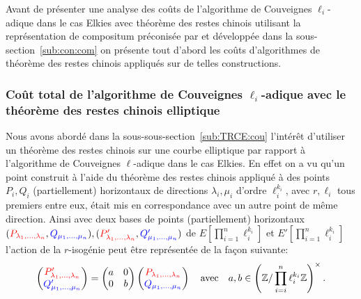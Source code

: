 \documentclass[10pt,a4paper]{book}
\theoremstyle{plain}
\theoremstyle{definition}
\theoremstyle{definition}
\theoremstyle{definition}
\theoremstyle{definition}
\theoremstyle{remark}
\theoremstyle{remark}
\theoremstyle{definition}
\begin{document}
Avant de présenter une analyse des coûts de l'algorithme de Couveignes 
$\ell_i$-adique dans le cas Elkies avec théorème des restes chinois utilisant la 
représentation de compositum préconisée par \cite{DeFeoDoliskaniSchost14} et 
développée dans la sous-section~\ref{sub:con:com} on présente tout d'abord les coûts 
d'algorithmes de théorème des restes chinois appliqués sur de telles constructions.

\subsubsection{Coût total de l'algorithme de Couveignes $\ell_i$-adique avec le théorème des restes chinois elliptique}
\label{sss:crt:cou}
Nous avons abordé dans la sous-sous-section~\ref{sub:TRCE:cou} l'intérêt 
d'utiliser un théorème des restes chinois sur une courbe elliptique par rapport
à l'algorithme de Couveignes $\ell$-adique dans le cas Elkies. En effet on a vu
qu'un point construit à l'aide du théorème des restes chinois appliqué à des 
points $P_i,Q_i$ (partiellement) horizontaux de directions $\lambda_i,\mu_i$  
d'ordre $\ell_i^{k_i}$, avec $r, \ell_i$ tous premiers entre eux, 
était mis en correspondance avec un autre point de même direction.
Ainsi avec deux bases de points (partiellement) horizontaux $(\color{red}P_{\lambda_1,
 \dots, \lambda_n}\color{black},\color{blue}Q_{\mu_1, \dots, 
 \mu_n}\color{black}),(\color{red}P'_{\lambda_1, \dots, \lambda_n}\color{black}
 ,\color{blue}
 Q'_{\mu_1, \dots, \mu_n}\color{black})$ de $E[\prod_{i=1}^n\ell_i^{k_i}]$ et 
 $E'[\prod_{i=1}^n\ell_i^{k_i}]$ l'action de la $r$-isogénie peut être 
 représentée de la façon suivante:  
 \begin{equation*}
\left(
\begin{matrix}
\color{red} P'_{\lambda_1,
 \dots, \lambda_n} \\
\color{blue} Q'_{\mu_1, \dots, 
 \mu_n} \color{black}
\end{matrix}
\right)= \left(\begin{matrix}
a & 0 \\
0 & b
\end{matrix} \right)
\left(
\begin{matrix}
\color{red} P_{\lambda_1, 
\dots, \lambda_n} \\
\color{blue} Q_{\mu_1, \dots, 
 \mu_n} \color{black}
\end{matrix}
\right)
\quad \text{avec} \quad a,b \in \left( \mathbb{Z}/\prod_{i=i}^n\ell_i^{k_i}\mathbb{Z} \right)^{\times}.
\end{equation*}
\end{document}
